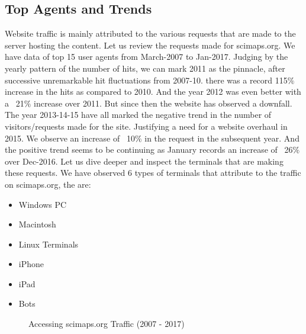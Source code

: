 \subsection{Top Agents and Trends} \label{viztopagents}
Website traffic is mainly attributed to the  various requests that are made to the server hosting the content. Let us review the requests made for scimaps.org. 
We have data of top 15 user agents from March-2007 to Jan-2017.  
Judging by the yearly pattern of the number of hits, we can mark 2011 as the pinnacle, after successive unremarkable hit fluctuations from 2007-10. there was a record 115$\%$ increase in the hits as compared to 2010. And the year 2012 was even better with a ~21$\%$ increase over 2011. But since then the website has observed a downfall. The year 2013-14-15 have all marked the negative trend in the number of visitors/requests made for the site. Justifying a need for a website overhaul in 2015. We observe an increase of ~10$\%$ in the request in the subsequent year. And the positive trend seems to be continuing as January records an increase of ~26$\%$  over Dec-2016.
Let us dive deeper and inspect the terminals that are making these requests. We have observed 6 types of terminals that attribute to the traffic on scimaps.org, the are:
\begin{itemize}
\item Windows PC
\item Macintosh
\item Linux Terminals
\item iPhone
\item iPad
\item Bots
\end{itemize}

\begin{figure}
\centering
{}
\caption{Accessing scimaps.org Traffic (2007 - 2017)}
\label{fig:TopAgents}
\end{figure}

